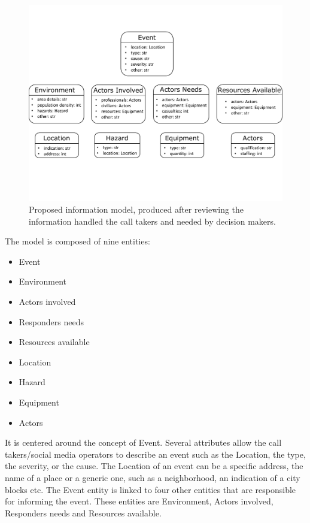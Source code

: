 \begin{figure}[htb]
    \centering
    \includegraphics[width=\textwidth]{figures/chap-3/information-needs.pdf}
    \caption{Proposed information model, produced after reviewing the information handled the call takers and needed by decision makers.}
    \label{information:information-models}
\end{figure}

The model is composed of nine entities:
\begin{itemize}
    \item Event
    \item Environment
    \item Actors involved
    \item Responders needs
    \item Resources available
    \item Location
    \item Hazard
    \item Equipment
    \item Actors
\end{itemize}

It is centered around the concept of Event.
Several attributes allow the call takers/social media operators to describe an event such as
the Location, the type, the severity, or the cause.
The Location of an event can be a specific address, the name of a place or a generic one,
such as a neighborhood, an indication of a city blocks etc.
The Event entity is linked to four other entities that are responsible for informing the event.
These entities are Environment, Actors involved, Responders needs and Resources available.

